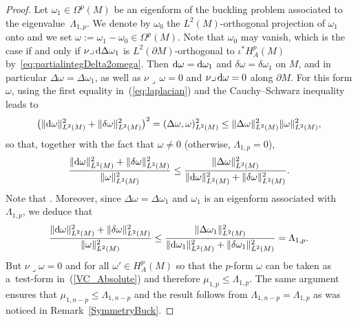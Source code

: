 \documentclass[pdftex]{sigma}
\numberwithin{equation}{section}
\theoremstyle{definition}
\begin{document}
\begin{proof} Let $\omega_1\in\Omega^p(M)$ be an eigenform of the buckling problem associated to the eigenvalue~$\Lambda_{1,p}$.
We denote by $\omega_0$ the $L^2(M)$-orthogonal projection of $\omega_1$ onto  and we set $\omega:=\omega_1-\omega_0\in \Omega^p(M)$.
Note that $\omega_0$ may vanish, which is the case if and only if $\nu\lrcorner\,{\rm d}\Delta\omega_1$ is $L^2(\partial M)$-orthogonal to $\iota^*H_A^p(M)$ by~\eqref{eq:partialintegDelta2omega}.
Then ${\rm d}\omega={\rm d}\omega_1$ and $\delta\omega=\delta\omega_1$ on $M$, and in particular $\Delta\omega=\Delta\omega_1$, as well as $\nu\lrcorner\,\omega=0$ and $\nu\lrcorner\,{\rm d}\omega=0$ along $\partial M$.
For this form $\omega$, using the first equality in~(\ref{eq:laplacian}) and the Cauchy--Schwarz inequality leads to
\begin{gather*}
\bigl(\|{\rm d}\omega\|_{L^2(M)}^2+\|\delta\omega\|_{L^2(M)}^2\bigr)^2 = (\Delta\omega,\omega )_{L^2(M)}^2 \leq \|\Delta\omega\|_{L^2(M)}^2 \|\omega\|_{L^2(M)}^2,
\end{gather*}
so that, together with the fact that $\omega\neq0$ (otherwise, $\Lambda_{1,p}=0$),
\[
\frac{\|{\rm d}\omega\|_{L^2(M)}^2+\|\delta\omega\|_{L^2(M)}^2}{\|\omega\|_{L^2(M)}^2}\leq\frac{\|\Delta\omega\|_{L^2(M)}^2}{\|{\rm d}\omega\|_{L^2(M)}^2+\|\delta\omega\|_{L^2(M)}^2}.
\]
Note that .
Moreover, since $\Delta\omega=\Delta\omega_1$ and $\omega_1$ is an eigenform associated with $\Lambda_{1,p}$, we deduce that
\[
\frac{\|{\rm d}\omega\|_{L^2(M)}^2+\|\delta\omega\|_{L^2(M)}^2}{\|\omega\|_{L^2(M)}^2}\leq\frac{\|\Delta\omega_1\|_{L^2(M)}^2}{\|{\rm d}\omega_1\|_{L^2(M)}^2+\|\delta\omega_1\|_{L^2(M)}^2}=\Lambda_{1,p}.
\]
But $\nu\lrcorner\omega=0$ and  for all $\omega'\in H_A^p(M)$ so that the $p$-form $\omega$ can be taken as a~test-form in~(\ref{VC_Absolute}) and therefore $\displaystyle\mu_{1,p}\leq \Lambda_{1,p}$.
The same argument ensures that $\mu_{1,n-p}\leq\Lambda_{1,n-p}$ and the result follows from $\Lambda_{1,n-p}=\Lambda_{1,p}$ as was noticed in Remark~\ref{SymmetryBuck}.


\end{proof}
\end{document}
